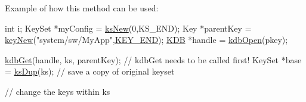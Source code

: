 \begin{DoxyParagraph}{Example of how this method can be used\-:}

\begin{DoxyCode}
\textcolor{keywordtype}{int} i;
KeySet *myConfig = \hyperlink{group__keyset_ga671e1aaee3ae9dc13b4834a4ddbd2c3c}{ksNew}(0,KS\_END);
Key *parentKey = \hyperlink{group__key_gad23c65b44bf48d773759e1f9a4d43b89}{keyNew}(\textcolor{stringliteral}{"system/sw/MyApp"},\hyperlink{group__key_gga91fb3178848bd682000958089abbaf40aa8adb6fcb92dec58fb19410eacfdd403}{KEY\_END});
\hyperlink{classkdb_1_1KDB_a7e0637995ce9f294cdbc6f167df6db40}{KDB} *handle = \hyperlink{group__kdb_ga6808defe5870f328dd17910aacbdc6ca}{kdbOpen}(pkey);

\hyperlink{group__kdb_ga28e385fd9cb7ccfe0b2f1ed2f62453a1}{kdbGet}(handle, ks, parentKey); \textcolor{comment}{// kdbGet needs to be called first!}
KeySet *base = \hyperlink{group__keyset_gac59e4b328245463f1451f68d5106151c}{ksDup}(ks); \textcolor{comment}{// save a copy of original keyset}

\textcolor{comment}{// change the keys within ks}


\end{DoxyCode}
\end{DoxyParagraph}
